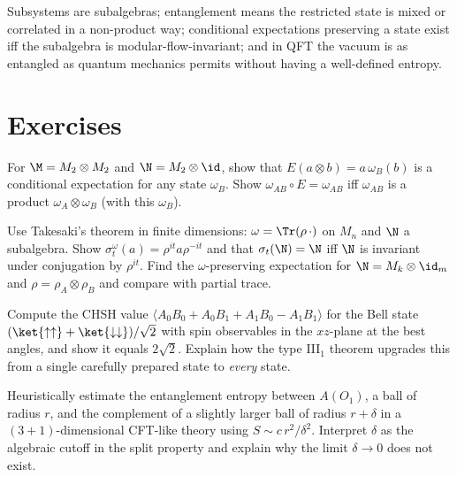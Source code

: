 \begin{keyidea}
Subsystems are subalgebras; entanglement means the restricted state is mixed or correlated in a non-product way; conditional expectations preserving a state exist iff the subalgebra is modular-flow-invariant; and in QFT the vacuum is as entangled as quantum mechanics permits without having a well-defined entropy.
\end{keyidea}

\section*{Exercises}
\begin{exercise}
For $\M=M_2\otimes M_2$ and $\N=M_2\otimes\id$, show that $E(a\otimes b)=a\,\omega_B(b)$ is a conditional expectation for any state $\omega_B$. Show $\omega_{AB}\circ E=\omega_{AB}$ iff $\omega_{AB}$ is a product $\omega_A\otimes\omega_B$ (with this $\omega_B$).
\end{exercise}
\begin{exercise}
Use Takesaki's theorem in finite dimensions: $\omega=\Tr(\rho\,\cdot)$ on $M_n$ and $\N$ a subalgebra. Show $\sigma^\omega_t(a)=\rho^{it}a\rho^{-it}$ and that $\sigma_t(\N)=\N$ iff $\N$ is invariant under conjugation by $\rho^{it}$. Find the $\omega$-preserving expectation for $\N=M_k\otimes\id_m$ and $\rho=\rho_A\otimes\rho_B$ and compare with partial trace.
\end{exercise}
\begin{exercise}
Compute the CHSH value $\langle A_0B_0+A_0B_1+A_1B_0-A_1B_1\rangle$ for the Bell state $(\ket{\uparrow\uparrow}+\ket{\downarrow\downarrow})/\sqrt2$ with spin observables in the $xz$-plane at the best angles, and show it equals $2\sqrt2$. Explain how the type III$_1$ theorem upgrades this from a single carefully prepared state to \emph{every} state.
\end{exercise}
\begin{exercise}
Heuristically estimate the entanglement entropy between $A(O_1)$, a ball of radius $r$, and the complement of a slightly larger ball of radius $r+\delta$ in a $(3+1)$-dimensional CFT-like theory using $S\sim c\,r^2/\delta^2$. Interpret $\delta$ as the algebraic cutoff in the split property and explain why the limit $\delta\to0$ does not exist.
\end{exercise}
